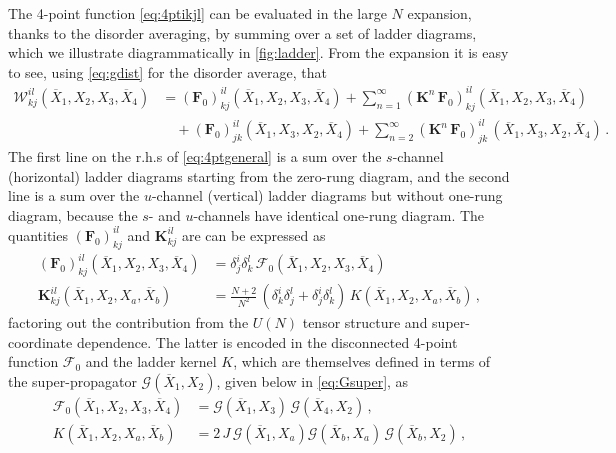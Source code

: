 \documentclass[11pt]{article}
\newcommand{\Xb}{\overline{X}}
\begin{document}
The 4-point function \eqref{eq:4ptikjl} can be evaluated in the large $N$  expansion, thanks to the disorder averaging, by summing over a set of ladder diagrams, which we illustrate diagrammatically in \cref{fig:ladder}.  From the expansion it is easy to see, using \eqref{eq:gdist} for the disorder average, that  
%
\begin{equation}\label{eq:4ptgeneral}
\begin{split}
\mathcal{W}^{il}_{kj} (\Xb_{1},X_{2},X_{3},\Xb_{4})  &=    ( \mathbf{F}_0)^{il}_{kj}(\Xb_{1},X_{2},X_{3},\Xb_{4})+ \sum_{n=1}^\infty (\mathbf{K}^n \,\mathbf{F}_0)^{il}_{kj} (\Xb_{1},X_{2},X_{3},\Xb_{4})
\\
&\quad+( \mathbf{F}_0)^{il}_{jk}(\Xb_{1},X_{3},X_{2},\Xb_{4})+ \sum_{n=2}^\infty (\mathbf{K}^n \,\mathbf{F}_0)^{il}_{jk}\, (\Xb_{1},X_{3},X_{2},\Xb_{4})  \,.
\end{split}
\end{equation}  
%
The first line on the r.h.s of \eqref{eq:4ptgeneral} is a sum over the $s$-channel (horizontal) ladder diagrams starting from the zero-rung diagram, and the second line is a sum over the $u$-channel (vertical) ladder diagrams but without one-rung diagram, because the $s$- and $u$-channels have identical one-rung diagram. 
The quantities $(\mathbf{F}_0)^{il}_{kj}$ and $\mathbf{K}^{il}_{kj}$  are can be expressed as 
%
\begin{equation}\label{eq:bFKdef}
\begin{split}
(\mathbf{F}_0)^{il}_{kj}(\Xb_{1},X_{2},X_{3},\Xb_{4})
&=
  \delta^i_j\delta^l_k\, \mathcal{F}_0(\Xb_{1},X_{2},X_{3},\Xb_{4}) \\
\mathbf{K}^{il}_{kj}(\Xb_1,X_2,X_a, \Xb_b)
&= 
  \frac{N+2}{N^2} \, (\delta^i_k\delta^l_j+\delta^i_j\delta^l_k) \, K(\Xb_1,X_2,X_a, \Xb_b)\,,
\end{split}
\end{equation}
%
factoring out the contribution from the $U(N)$ tensor structure and super-coordinate dependence.  The latter is encoded in the disconnected 4-point function $\mathcal{F}_0$ and the ladder kernel $K$, which are themselves defined in terms of the super-propagator $\mathscr{G}(\Xb_1,X_2)$, given below in \eqref{eq:Gsuper}, as 
%
\begin{equation}
\begin{split}
\mathcal{F}_0(\Xb_{1},X_{2},X_{3},\Xb_{4}) 
& =  
  \mathscr{G}(\Xb_1,X_3) \,\mathscr{G}(\Xb_4,X_2)\,,
\\
K(\Xb_{1},X_{2},X_{a},\Xb_{b}) 
  &= 2\,J\, \mathscr{G}(\Xb_1,X_a) \mathscr{G}(\Xb_b,X_a) \, \mathscr{G}(\Xb_b,X_2) \,,
\end{split}
\end{equation}
\end{document}
